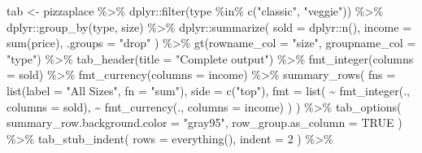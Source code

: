 \documentclass[
  letterpaper,
  DIV=11,
  numbers=noendperiod]{scrartcl}
\newenvironment{Shaded}{\begin{snugshade}}{\end{snugshade}}
\newcommand{\AttributeTok}[1]{\textcolor[rgb]{0.40,0.45,0.13}{#1}}
\newcommand{\ConstantTok}[1]{\textcolor[rgb]{0.56,0.35,0.01}{#1}}
\newcommand{\DecValTok}[1]{\textcolor[rgb]{0.68,0.00,0.00}{#1}}
\newcommand{\FunctionTok}[1]{\textcolor[rgb]{0.28,0.35,0.67}{#1}}
\newcommand{\NormalTok}[1]{\textcolor[rgb]{0.00,0.23,0.31}{#1}}
\newcommand{\OtherTok}[1]{\textcolor[rgb]{0.00,0.23,0.31}{#1}}
\newcommand{\SpecialCharTok}[1]{\textcolor[rgb]{0.37,0.37,0.37}{#1}}
\newcommand{\StringTok}[1]{\textcolor[rgb]{0.13,0.47,0.30}{#1}}
\begin{document}
\begin{Shaded}
\begin{Highlighting}[]
\NormalTok{tab }\OtherTok{\textless{}{-}}\NormalTok{ pizzaplace }\SpecialCharTok{\%\textgreater{}\%}
\NormalTok{  dplyr}\SpecialCharTok{::}\FunctionTok{filter}\NormalTok{(type }\SpecialCharTok{\%in\%} \FunctionTok{c}\NormalTok{(}\StringTok{"classic"}\NormalTok{, }\StringTok{"veggie"}\NormalTok{)) }\SpecialCharTok{\%\textgreater{}\%}
\NormalTok{  dplyr}\SpecialCharTok{::}\FunctionTok{group\_by}\NormalTok{(type, size) }\SpecialCharTok{\%\textgreater{}\%}
\NormalTok{  dplyr}\SpecialCharTok{::}\FunctionTok{summarize}\NormalTok{(}
    \AttributeTok{sold =}\NormalTok{ dplyr}\SpecialCharTok{::}\FunctionTok{n}\NormalTok{(),}
    \AttributeTok{income =} \FunctionTok{sum}\NormalTok{(price),}
    \AttributeTok{.groups =} \StringTok{"drop"}
\NormalTok{  ) }\SpecialCharTok{\%\textgreater{}\%}
  \FunctionTok{gt}\NormalTok{(}\AttributeTok{rowname\_col =} \StringTok{"size"}\NormalTok{, }\AttributeTok{groupname\_col =} \StringTok{"type"}\NormalTok{) }\SpecialCharTok{\%\textgreater{}\%}
  \FunctionTok{tab\_header}\NormalTok{(}\AttributeTok{title =} \StringTok{"Complete output"}\NormalTok{) }\SpecialCharTok{\%\textgreater{}\%}
  \FunctionTok{fmt\_integer}\NormalTok{(}\AttributeTok{columns =}\NormalTok{ sold) }\SpecialCharTok{\%\textgreater{}\%}
  \FunctionTok{fmt\_currency}\NormalTok{(}\AttributeTok{columns =}\NormalTok{ income) }\SpecialCharTok{\%\textgreater{}\%}
  \FunctionTok{summary\_rows}\NormalTok{(}
    \AttributeTok{fns =} \FunctionTok{list}\NormalTok{(}\AttributeTok{label =} \StringTok{"All Sizes"}\NormalTok{, }\AttributeTok{fn =} \StringTok{"sum"}\NormalTok{),}
    \AttributeTok{side =} \FunctionTok{c}\NormalTok{(}\StringTok{"top"}\NormalTok{),}
    \AttributeTok{fmt =} \FunctionTok{list}\NormalTok{(}
      \SpecialCharTok{\textasciitilde{}} \FunctionTok{fmt\_integer}\NormalTok{(., }\AttributeTok{columns =}\NormalTok{ sold),}
      \SpecialCharTok{\textasciitilde{}} \FunctionTok{fmt\_currency}\NormalTok{(., }\AttributeTok{columns =}\NormalTok{ income)}
\NormalTok{    )}
\NormalTok{  ) }\SpecialCharTok{\%\textgreater{}\%}
  \FunctionTok{tab\_options}\NormalTok{(}
    \AttributeTok{summary\_row.background.color =} \StringTok{"gray95"}\NormalTok{,}
    \AttributeTok{row\_group.as\_column =} \ConstantTok{TRUE}
\NormalTok{  ) }\SpecialCharTok{\%\textgreater{}\%}
  \FunctionTok{tab\_stub\_indent}\NormalTok{(}
    \AttributeTok{rows =} \FunctionTok{everything}\NormalTok{(),}
    \AttributeTok{indent =} \DecValTok{2}
\NormalTok{  ) }\SpecialCharTok{\%\textgreater{}\%}

\end{Highlighting}
\end{Shaded}
\end{document}

